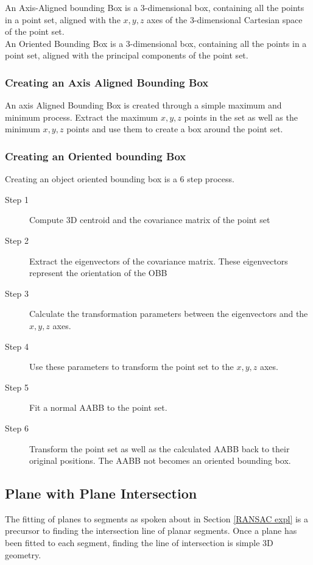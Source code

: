 		An Axis-Aligned bounding Box is a 3-dimensional box, containing all the points in a point set, aligned with the $x,y,z$ axes of the 3-dimensional Cartesian space of the point set.\\
		
		An Oriented Bounding Box is a 3-dimensional box, containing all the points in a point set, aligned with the principal components of the point set.
		
		\subsubsection{Creating an Axis Aligned Bounding Box}
			An axis Aligned Bounding Box is created through a simple maximum and minimum process.
			Extract the maximum $x,y,z$ points in the set as well as the minimum $x,y,z$ points and use them to create a box around the point set.
		
		\subsubsection{Creating an Oriented bounding Box}
			Creating an object oriented bounding box is a 6 step process.
			\begin{description}
				\item[Step 1] Compute 3D centroid and the covariance matrix of the point set
									
				\item[Step 2] Extract the eigenvectors of the covariance matrix. These eigenvectors represent the orientation of the OBB
				
				\item[Step 3] Calculate the transformation parameters between the eigenvectors and the $x,y,z$ axes.
				
				\item[Step 4] Use these parameters to transform the point set to the $x,y,z$ axes.
				
				\item[Step 5] Fit a normal AABB to the point set.
				
				\item[Step 6] Transform the point set as well as the calculated AABB back to their original positions. The AABB not becomes an oriented bounding box.
			\end{description}
			
	\subsection{Plane with Plane Intersection}
	\label{plane-planeInter}
	The fitting of planes to segments as spoken about in Section \ref{RANSAC expl} is a precursor to finding the intersection line of planar segments. Once a plane has been fitted to each segment, finding the line of intersection is simple 3D geometry.
	

